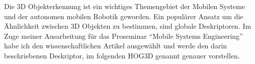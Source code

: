 Die 3D Objekterkennung ist ein wichtiges Themengebiet der Mobilen Systeme und der autonomen mobilen Robotik geworden.
Ein populärer Ansatz um die Ähnlichkeit zwischen 3D Objekten zu bestimmen, sind globale Deskriptoren. Im Zuge
meiner Ausarbeitung für das Proseminar "`Mobile Systems Engineering"' habe ich den wissenschaftlichen Artikel 
\cite{scherer2010histograms} ausgewählt und werde den darin beschriebenen Deskriptor, im folgenden HOG3D genannt
genauer vorstellen.